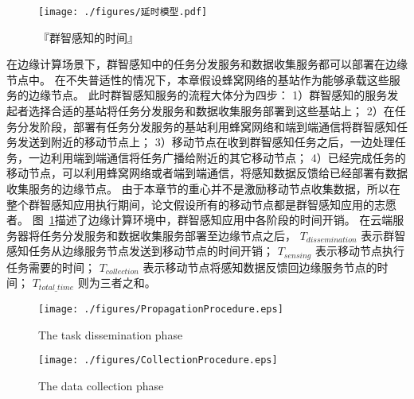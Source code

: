 \begin{figure}[!b]
  \centering
  \vspace{-1em}
  \texttt{[image: ./figures/延时模型.pdf]}
  \vspace{-0.5em}
  \caption{『群智感知的时间』}
  \label{Figure_MCS_Delay}
\end{figure}

在边缘计算场景下，群智感知中的任务分发服务和数据收集服务都可以部署在边缘节点中。
在不失普适性的情况下，本章假设蜂窝网络的基站作为能够承载这些服务的边缘节点。
此时群智感知服务的流程大体分为四步：
1）群智感知的服务发起者选择合适的基站将任务分发服务和数据收集服务部署到这些基站上；
2）在任务分发阶段，部署有任务分发服务的基站利用蜂窝网络和端到端通信将群智感知任务发送到附近的移动节点上；
3）移动节点在收到群智感知任务之后，一边处理任务，一边利用端到端通信将任务广播给附近的其它移动节点；
4）已经完成任务的移动节点，可以利用蜂窝网络或者端到端通信，将感知数据反馈给已经部署有数据收集服务的边缘节点。
由于本章节的重心并不是激励移动节点收集数据，所以在整个群智感知应用执行期间，论文假设所有的移动节点都是群智感知应用的志愿者。
图~\ref{Figure_MCS_Delay}描述了边缘计算环境中，群智感知应用中各阶段的时间开销。
在云端服务器将任务分发服务和数据收集服务部署至边缘节点之后，
$T_{dissemination}$ 表示群智感知任务从边缘服务节点发送到移动节点的时间开销；
$T_{sensing}$ 表示移动节点执行任务需要的时间；
$T_{collection}$ 表示移动节点将感知数据反馈回边缘服务节点的时间；
$T_{total\_time}$ 则为三者之和。



\begin{figure}[!h]
  \centering
  \vspace{-1em}
  \texttt{[image: ./figures/PropagationProcedure.eps]}
  \vspace{-1em}
  \caption{The task dissemination phase}
  \label{Figure_PropagationProcedure}
\end{figure}

\begin{figure}[!h]
  \centering
  \texttt{[image: ./figures/CollectionProcedure.eps]}
  \vspace{-1em}
  \caption{The data collection phase}
  \vspace{-1.5em}
  \label{Figure_FeedbacksCollection}
\end{figure}

